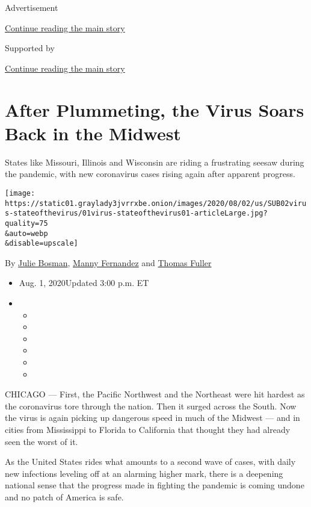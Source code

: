 Advertisement

\protect\hyperlink{after-top}{Continue reading the main story}

Supported by

\protect\hyperlink{after-sponsor}{Continue reading the main story}

\hypertarget{after-plummeting-the-virus-soars-back-in-the-midwest}{%
\section{After Plummeting, the Virus Soars Back in the
Midwest}\label{after-plummeting-the-virus-soars-back-in-the-midwest}}

States like Missouri, Illinois and Wisconsin are riding a frustrating
seesaw during the pandemic, with new coronavirus cases rising again
after apparent progress.

\texttt{[image: https://static01.graylady3jvrrxbe.onion/images/2020/08/02/us/SUB02virus-stateofthevirus/01virus-stateofthevirus01-articleLarge.jpg?quality=75\\\&auto=webp\\\&disable=upscale]}

By \href{https://www.nytimes3xbfgragh.onion/by/julie-bosman}{Julie
Bosman},
\href{https://www.nytimes3xbfgragh.onion/by/manny-fernandez}{Manny
Fernandez} and
\href{https://www.nytimes3xbfgragh.onion/by/thomas-fuller}{Thomas
Fuller}

\begin{itemize}
\item
  Aug. 1, 2020Updated 3:00 p.m. ET
\item
  \begin{itemize}
  \item
  \item
  \item
  \item
  \item
  \item
  \end{itemize}
\end{itemize}

CHICAGO --- First, the Pacific Northwest and the Northeast were hit
hardest as the coronavirus tore through the nation. Then it surged
across the South. Now the virus is again picking up dangerous speed in
much of the Midwest --- and in cities from Mississippi to Florida to
California that thought they had already seen the worst of it.

As the United States rides what amounts to a second wave of cases, with
daily new infections leveling off at an alarming higher mark, there is a
deepening national sense that the progress made in fighting the pandemic
is coming undone and no patch of America is safe.

